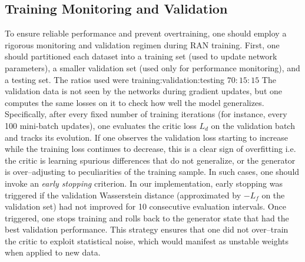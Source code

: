     \subsection{Training Monitoring and Validation}
        To ensure reliable performance and prevent overtraining, one should employ a rigorous monitoring and validation regimen during RAN training.
        First, one should partitioned each dataset into a training set (used to update network parameters), a smaller validation set (used only for performance monitoring), and a testing set.
        The ratios used were training:validation:testing \(70:15:15\)
        The validation data is not seen by the networks during gradient updates, but one computes the same losses on it to check how well the model generalizes.
        Specifically, after every fixed number of training iterations (for instance, every 100 mini-batch updates), one evaluates the critic loss $L_d$ on the validation batch and tracks its evolution.
        If one observes the validation loss starting to increase while the training loss continues to decrease, this is a clear sign of overfitting i.e. the critic is learning spurious differences that do not generalize, or the generator is over--adjusting to peculiarities of the training sample.
        In such cases, one should invoke an \emph{early stopping} criterion.
        In our implementation, early stopping was triggered if the validation Wasserstein distance (approximated by $-L_f$ on the validation set) had not improved for 10 consecutive evaluation intervals.
        Once triggered, one stops training and rolls back to the generator state that had the best validation performance.
        This strategy ensures that one did not over--train the critic to exploit statistical noise, which would manifest as unstable weights when applied to new data.

